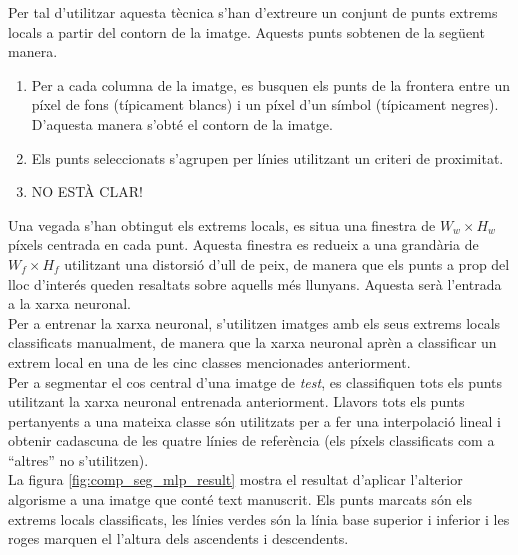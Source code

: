 Per tal d'utilitzar aquesta tècnica s'han d'extreure un conjunt de punts extrems locals a partir del contorn de la imatge. Aquests punts sobtenen de la següent manera.
\begin{enumerate}
\item Per a cada columna de la imatge, es busquen els punts de la frontera entre un píxel de fons (típicament blancs) i un píxel d'un símbol (típicament negres). D'aquesta manera s'obté el contorn de la imatge.
\item Els punts seleccionats s'agrupen per línies utilitzant un criteri de proximitat.
\item NO ESTÀ CLAR!
\end{enumerate}

Una vegada s'han obtingut els extrems locals, es situa una finestra de $W_w \times H_w$ píxels centrada en cada punt. Aquesta finestra es redueix a una grandària de $W_f \times H_f$ utilitzant una distorsió d'ull de peix, de manera que els punts a prop del lloc d'interés queden resaltats sobre aquells més llunyans. Aquesta serà l'entrada a la xarxa neuronal.\\

Per a entrenar la xarxa neuronal, s'utilitzen imatges amb els seus extrems locals classificats manualment, de manera que la xarxa neuronal aprèn a classificar un extrem local en una de les cinc classes mencionades anteriorment.\\

Per a segmentar el cos central d'una imatge de \emph{test}, es classifiquen tots els punts utilitzant la xarxa neuronal entrenada anteriorment. Llavors tots els punts pertanyents a una mateixa classe són utilitzats per a fer una interpolació lineal i obtenir cadascuna de les quatre línies de referència (els píxels classificats com a ``altres'' no s'utilitzen).\\

La figura \ref{fig:comp_seg_mlp_result} mostra el resultat d'aplicar l'alterior algorisme a una imatge que conté text manuscrit. Els punts marcats són els extrems locals classificats, les línies verdes són la línia base superior i inferior i les roges marquen el l'altura dels ascendents i descendents.\\

